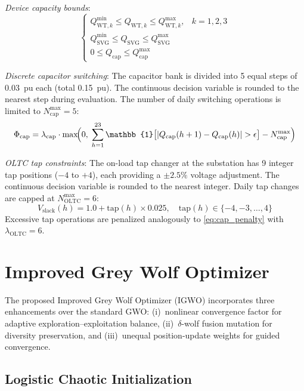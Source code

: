 \textit{Device capacity bounds}:
\begin{equation}
\begin{cases}
Q_{\text{WT},k}^{\min} \leq Q_{\text{WT},k} \leq Q_{\text{WT},k}^{\max}, & k=1,2,3 \\[2pt]
Q_{\text{SVG}}^{\min} \leq Q_{\text{SVG}} \leq Q_{\text{SVG}}^{\max} \\[2pt]
0 \leq Q_{\text{cap}} \leq Q_{\text{cap}}^{\max}
\end{cases}
\label{eq:device_bounds}
\end{equation}

\textit{Discrete capacitor switching}: The capacitor bank is divided into 5 equal steps of 0.03~pu each (total 0.15~pu). The continuous decision variable is rounded to the nearest step during evaluation. The number of daily switching operations is limited to $N_{\text{cap}}^{\max}=5$:
\begin{equation}
\Phi_{\text{cap}} = \lambda_{\text{cap}} \cdot \max\!\Bigl(0,\; \sum_{h=1}^{23} \mathbb{1}\bigl[|Q_{\text{cap}}(h+1)-Q_{\text{cap}}(h)|>\epsilon\bigr] - N_{\text{cap}}^{\max}\Bigr)
\label{eq:cap_penalty}
\end{equation}

\textit{OLTC tap constraints}: The on-load tap changer at the substation has 9 integer tap positions ($-4$ to $+4$), each providing a $\pm 2.5\%$ voltage adjustment. The continuous decision variable is rounded to the nearest integer. Daily tap changes are capped at $N_{\text{OLTC}}^{\max}=6$:
\begin{equation}
V_{\text{slack}}(h) = 1.0 + \text{tap}(h) \times 0.025,\quad \text{tap}(h) \in \{-4,-3,\ldots,4\}
\label{eq:oltc_model}
\end{equation}
Excessive tap operations are penalized analogously to \eqref{eq:cap_penalty} with $\lambda_{\text{OLTC}}=6$.

\section{Improved Grey Wolf Optimizer}

The proposed Improved Grey Wolf Optimizer (IGWO) incorporates three enhancements over the standard GWO: (i)~nonlinear convergence factor for adaptive exploration--exploitation balance, (ii)~$\delta$-wolf fusion mutation for diversity preservation, and (iii)~unequal position-update weights for guided convergence.

\subsection{Logistic Chaotic Initialization}

